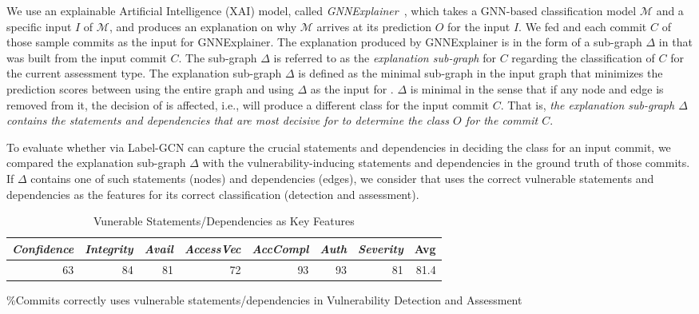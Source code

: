 We use an explainable Artificial Intelligence (XAI) model,
called {\em GNNExplainer}~\cite{GNNExplainer}, which takes a GNN-based
classification model $\mathcal{M}$ and a specific input $I$ of
$\mathcal{M}$, and produces an explanation on why $\mathcal{M}$
arrives at its prediction $O$ for the input $I$.
%
We fed {\tool} and each commit $C$ of those sample commits as the
input for GNNExplainer. The explanation produced by GNNExplainer is in
the form of a sub-graph $\Delta$ in {\mvpdg} that was built from the
input commit $C$. The sub-graph $\Delta$ is referred to as the {\em
explanation sub-graph} for $C$ regarding the classification of $C$ for
the current assessment type. The explanation sub-graph $\Delta$ is
defined as the minimal sub-graph in the input graph {\mvpdg} that
minimizes the prediction scores between using the entire graph
{\mvpdg} and using $\Delta$ as the input for {\tool}. $\Delta$ is
minimal in the sense that if any node and edge is removed from it, the
decision of {\tool} is affected, i.e., {\tool} will produce a
different class for the input commit $C$. That is, {\em the
explanation sub-graph $\Delta$ contains the statements and
dependencies that are most decisive for {\tool} to determine the class
$O$ for the commit $C$}.

To evaluate whether {\tool} via Label-GCN can capture the crucial
statements and dependencies in deciding the class for an input commit,
we compared the explanation sub-graph $\Delta$ with the
vulnerability-inducing statements and dependencies in the ground
truth of those commits. If $\Delta$ contains one of such statements
(nodes) and dependencies (edges), we consider that {\tool} uses the
correct vulnerable statements and dependencies as the features for its
correct classification (detection and assessment).


\begin{table}[t]
\caption{Vunerable Statements/Dependencies as Key Features}
	\vspace{-12pt}
	\tabcolsep 2.3pt
\small
	\begin{center}
\begin{tabular}{|r|r|r|r|r|r|r||r|}
  \hline
     {\em Confidence} & {\em Integrity} & {\em Avail} & {\em AccessVec} & {\em AccCompl} & {\em Auth} & {\em Severity} & {\bf Avg} \\
  \hline
    63 & 84 & 81 & 72 & 93 & 93 & 81 & 81.4 \\
  \hline
\end{tabular}
\label{gnn}
\%Commits {\tool} correctly uses vulnerable statements/dependencies in Vulnerability Detection and Assessment
\end{center}
\vspace{-12pt}
\end{table}

